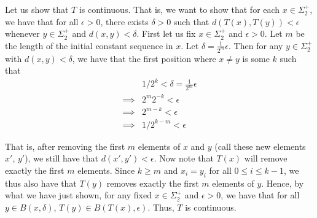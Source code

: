 \documentclass[12pt]{article}
\begin{document}
Let us show that $T$ is continuous. That is, we want to show that for each $x \in \Sigma_2^+$, we have that for all $\epsilon > 0$, there exists $\delta > 0$ such that $d(T(x), T(y)) < \epsilon$ whenever $y \in \Sigma_2^+$ and $d(x, y) < \delta$. First let us fix $x \in \Sigma_2^+$ and $\epsilon > 0$. Let $m$ be the length of the initial constant sequence in $x$. Let $\delta = \frac{1}{2^m}\epsilon$. Then for any $y \in \Sigma_2^+$ with $d(x, y) < \delta$, we have that the first position where $x \neq y$ is some $k$ such that 
\begin{align*}
&1/2^k < \delta = \frac{1}{2^m}\epsilon\\
\implies &2^m2^{-k} < \epsilon\\
\implies &2^{m-k} < \epsilon\\
\implies &1/2^{k-m} < \epsilon
\end{align*}

That is, after removing the first $m$ elements of $x$ and $y$ (call these new elements $x'$, $y'$), we still have that $d(x', y') < \epsilon$. Now note that $T(x)$ will remove exactly the first $m$ elements. Since $k \geq m$ and $x_i = y_i$ for all $0 \leq i \leq k - 1$, we thus also have that $T(y)$ removes exactly the first $m$ elements of $y$. Hence, by what we have just shown, for any fixed $x \in \Sigma_2^+$ and $\epsilon > 0$, we have that for all $y \in B(x, \delta)$, $T(y) \in B(T(x), \epsilon)$. Thus, $T$ is continuous.
\end{document}
